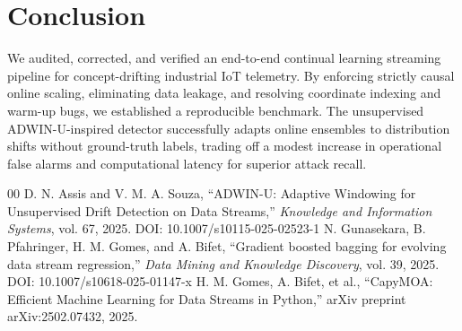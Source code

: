 \documentclass[conference]{IEEEtran}
\begin{document}
\section{Conclusion}
We audited, corrected, and verified an end-to-end continual learning streaming pipeline for concept-drifting industrial IoT telemetry. By enforcing strictly causal online scaling, eliminating data leakage, and resolving coordinate indexing and warm-up bugs, we established a reproducible benchmark. The unsupervised ADWIN-U-inspired detector successfully adapts online ensembles to distribution shifts without ground-truth labels, trading off a modest increase in operational false alarms and computational latency for superior attack recall.

\begin{thebibliography}{00}
 D. N. Assis and V. M. A. Souza, ``ADWIN-U: Adaptive Windowing for Unsupervised Drift Detection on Data Streams,'' \emph{Knowledge and Information Systems}, vol. 67, 2025. DOI: 10.1007/s10115-025-02523-1
 N. Gunasekara, B. Pfahringer, H. M. Gomes, and A. Bifet, ``Gradient boosted bagging for evolving data stream regression,'' \emph{Data Mining and Knowledge Discovery}, vol. 39, 2025. DOI: 10.1007/s10618-025-01147-x
 H. M. Gomes, A. Bifet, et al., ``CapyMOA: Efficient Machine Learning for Data Streams in Python,'' arXiv preprint arXiv:2502.07432, 2025.
\end{thebibliography}
\end{document}
